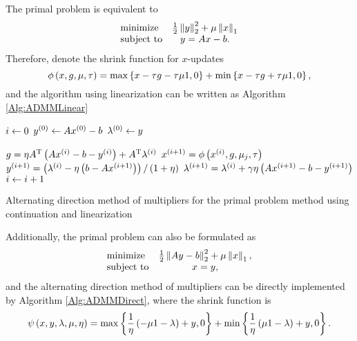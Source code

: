 \documentclass[english]{pkupaper}
\begin{document}
\begin{thmquestion}[3 (i)]
The primal problem is equivalent to
\begin{equation}
\begin{array}{lc}
\mathrel{\text{{minimize}}} & \frac{1}{2} \left\| y \right\|_2^2 + \mu \left\| x \right\|_1 \\
\mathrel{\text{{subject to}}} & y = A x - b.
\end{array}
\end{equation}
Therefore, denote the shrink function for $x$-updates
\begin{equation}
\phi \left(  x, g, \mu, \tau  \right) = \max \left\{  x - \tau g - \tau \mu 1, 0  \right\} + \min \left\{  x - \tau g + \tau \mu 1, 0  \right\},
\end{equation}
and the algorithm using linearization can be written as Algorithm \ref{Alg:ADMMLinear}

\begin{algorithm}
\SetAlgoLined


$ i \leftarrow 0 $\;
$ y^{\left( 0 \right)} \leftarrow A x^{\left( 0 \right)} - b $\;
$ \lambda^{\left( 0 \right)} \leftarrow y $\;

{
	{
		$ g = \eta A^{\mathrm{T}} \left(  A x^{\left( i \right)} - b - y^{\left( i \right)}  \right) + A^{\mathrm{T}} \lambda^{\left( i \right)} $\;
		$ x^{\left(  i + 1  \right)} = \phi \left(  x^{\left( i \right)}, g, \mu_j, \tau  \right) $\;
		$ y^{\left(  i + 1  \right)} = \left(  \lambda^{\left( i \right)} - \eta \left(  b - A x^{\left(  i + 1  \right)}  \right)  \right) / \left(  1 + \eta  \right) $\;
		$ \lambda^{\left(  i + 1  \right)} = \lambda^{\left( i \right)} + \gamma \eta \left(  A x^{\left(  i + 1  \right)} - b - y^{\left(  i + 1  \right)}  \right) $\;
		$ i \leftarrow i + 1 $\;
	}
}

\caption{Alternating direction method of multipliers for the primal problem method using continuation and linearization} \label{Alg:ADMMLinear}
\end{algorithm}

Additionally, the primal problem can also be formulated as
\begin{equation}
\begin{array}{lc}
\mathrel{\text{{minimize}}} & \frac{1}{2} \left\|  A y - b  \right\|_2^2 + \mu \left\| x \right\|_1, \\
\mathrel{\text{{subject to}}} & x = y,
\end{array}
\end{equation}
and the alternating direction method of multipliers can be directly implemented by Algorithm \ref{Alg:ADMMDirect}, where the shrink function is
\begin{equation}
\psi \left(  x, y, \lambda, \mu, \eta  \right) = \max \left\{  \frac{1}{\eta} \left(  -\mu 1 - \lambda  \right) + y, 0  \right\} + \min \left\{  \frac{1}{\eta} \left(  \mu 1 - \lambda  \right) + y, 0  \right\}.
\end{equation}


\end{thmquestion}
\end{document}
